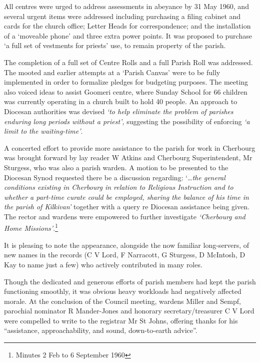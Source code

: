 All centres were urged to address assessments in abeyance by 31 May 1960, and several urgent items were addressed including purchasing a filing cabinet and cards for the church office; Letter Heads for correspondence; and the installation of a `moveable phone' and three extra power points. It was proposed to purchase `a full set of vestments for priests' use, to remain property of the parish.



The completion of a full set of Centre Rolls and a full Parish Roll was addressed. The mooted and earlier attempts at a `Parish Canvas' were to be fully implemented in order to formalize pledges for budgeting purposes. The meeting also voiced ideas to assist Goomeri centre, where Sunday School for 66 children was currently operating in a church built to hold 40 people. An approach to Diocesan authorities was devised \emph{`to help eliminate the problem of parishes enduring long periods without a priest',} suggesting the possibility of enforcing \emph{`a limit to the waiting-time'}.



A concerted effort to provide more assistance to the parish for work in Cherbourg was brought forward by lay reader W Atkins and Cherbourg Superintendent, Mr Sturgess, who was also a parish warden. A motion to be presented to the Diocesan Synod requested there be a discussion regarding: `\ldots{}\emph{the general conditions existing in Cherbourg in relation to Religious Instruction and to whether a part-time curate could be employed, sharing the balance of his time in the parish of Kilkivan'} together with a query re Diocesan assistance being given. The rector and wardens were empowered to further investigate \emph{`Cherbourg and Home Missions'}.\footnote{Minutes 2 Feb to 6 September 1960}


It is pleasing to note the appearance, alongside the now familiar long-servers, of new names in the records (C V Lord, F Narracott, G Sturgess, D McIntosh, D Kay to name just a few) who actively contributed in many roles.



Though the dedicated and generous efforts of parish members had kept the parish functioning smoothly, it was obvious heavy workloads had negatively affected morale. At the conclusion of the Council meeting, wardens Miller and Sempf, parochial nominator R Mander-Jones and honorary secretary/treasurer C V Lord were compelled to write to the registrar Mr St Johns, offering thanks for his ``assistance, approachability, and sound, down-to-earth advice''.



